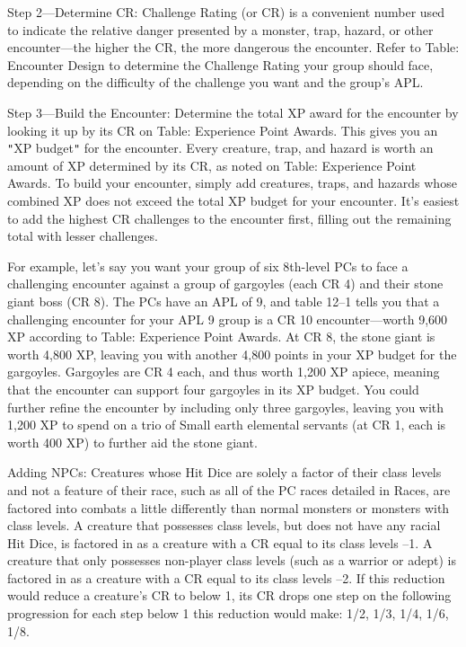 
				
Step 2---Determine CR: Challenge Rating (or CR) is a convenient number used to indicate the relative danger presented by a monster, trap, hazard, or other encounter---the higher the CR, the more dangerous the encounter. Refer to Table: Encounter Design to determine the Challenge Rating your group should face, depending on the difficulty of the challenge you want and the group's APL.
				
Step 3---Build the Encounter: Determine the total XP award for the encounter by looking it up by its CR on Table: Experience Point Awards. This gives you an \texttt{{}"{}}XP budget\texttt{{}"{}} for the encounter. Every creature, trap, and hazard is worth an amount of XP determined by its CR, as noted on Table: Experience Point Awards. To build your encounter, simply add creatures, traps, and hazards whose combined XP does not exceed the total XP budget for your encounter. It's easiest to add the highest CR challenges to the encounter first, filling out the remaining total with lesser challenges.
				
For example, let's say you want your group of six 8th-level PCs to face a challenging encounter against a group of gargoyles (each CR 4) and their stone giant boss (CR 8). The PCs have an APL of 9, and table 12--1 tells you that a challenging encounter for your APL 9 group is a CR 10 encounter---worth 9,600 XP according to Table: Experience Point Awards. At CR 8, the stone giant is worth 4,800 XP, leaving you with another 4,800 points in your XP budget for the gargoyles. Gargoyles are CR 4 each, and thus worth 1,200 XP apiece, meaning that the encounter can support four gargoyles in its XP budget. You could further refine the encounter by including only three gargoyles, leaving you with 1,200 XP to spend on a trio of Small earth elemental servants (at CR 1, each is worth 400 XP) to further aid the stone giant.
				
Adding NPCs: Creatures whose Hit Dice are solely a factor of their class levels and not a feature of their race, such as all of the PC races detailed in Races, are factored into combats a little differently than normal monsters or monsters with class levels. A creature that possesses class levels, but does not have any racial Hit Dice, is factored in as a creature with a CR equal to its class levels --1. A creature that only possesses non-player class levels (such as a warrior or adept) is factored in as a creature with a CR equal to its class levels --2. If this reduction would reduce a creature's CR to below 1, its CR drops one step on the following progression for each step below 1 this reduction would make: 1/2, 1/3, 1/4, 1/6, 1/8.
				
